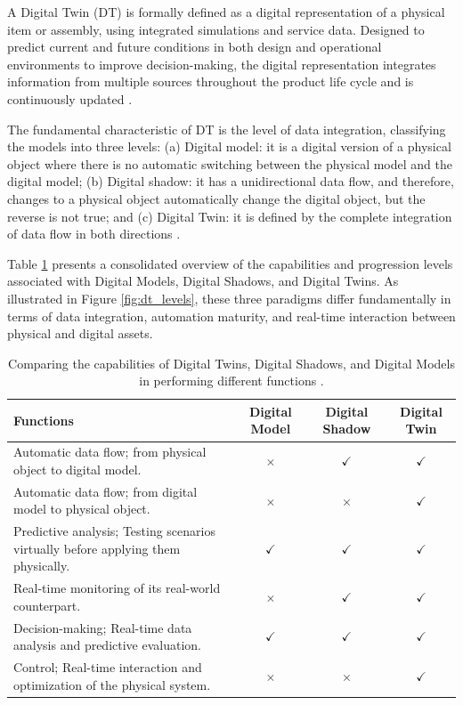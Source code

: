 A Digital Twin (DT) is formally defined as a digital representation of a physical item or assembly, using integrated simulations and service data. Designed to predict current and future conditions in both design and operational environments to improve decision-making, the digital representation integrates information from multiple sources throughout the product life cycle and is continuously updated \citep{fuller2020, jiang2021}.

The fundamental characteristic of DT is the level of data integration, classifying the models into three levels: (a) Digital model: it is a digital version of a physical object where there is no automatic switching between the physical model and the digital model; (b) Digital shadow: it has a unidirectional data flow, and therefore, changes to a physical object automatically change the digital object, but the reverse is not true; and (c) Digital Twin: it is defined by the complete integration of data flow in both directions \citep{iranshahi2025digital}.

Table \ref{tab:digital_capabilities} presents a consolidated overview of the capabilities and progression levels associated with Digital Models, Digital Shadows, and Digital Twins. As illustrated in Figure \ref{fig:dt_levels}, these three paradigms differ fundamentally in terms of data integration, automation maturity, and real-time interaction between physical and digital assets.

\begin{table}[htbp!]
\centering
\caption{Comparing the capabilities of Digital Twins, Digital Shadows, and Digital Models in performing different functions \citep{iranshahi2025digital}.}
\label{tab:digital_capabilities}
\begin{tabular}{p{7cm}ccc}
\toprule
\textbf{Functions} & \textbf{Digital Model} & \textbf{Digital Shadow} & \textbf{Digital Twin} \\
\midrule
Automatic data flow; from physical object to digital model. & $\times$ & $\checkmark$ & $\checkmark$ \\
Automatic data flow; from digital model to physical object. & $\times$ & $\times$ & $\checkmark$ \\
Predictive analysis; Testing scenarios virtually before applying them physically. & $\checkmark$ & $\checkmark$ & $\checkmark$ \\
Real-time monitoring of its real-world counterpart. & $\times$ & $\checkmark$ & $\checkmark$ \\
Decision-making; Real-time data analysis and predictive evaluation. & $\checkmark$ & $\checkmark$ & $\checkmark$ \\
Control; Real-time interaction and optimization of the physical system. & $\times$ & $\times$ & $\checkmark$ \\
\bottomrule
\end{tabular}
\end{table}



